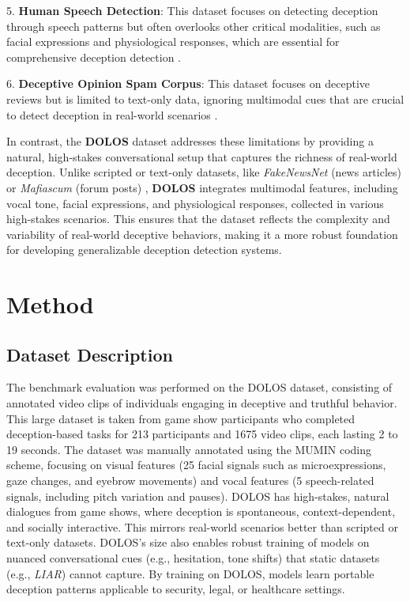\documentclass[11pt]{article}
\begin{document}
5. \textbf{Human Speech Detection}: This dataset focuses on detecting deception through speech patterns but often overlooks other critical modalities, such as facial expressions and physiological responses, which are essential for comprehensive deception detection \citep{Benus2016speech}.

6. \textbf{Deceptive Opinion Spam Corpus}: This dataset focuses on deceptive reviews but is limited to text-only data, ignoring multimodal cues that are crucial to detect deception in real-world scenarios \citep{ott2011findingdeceptive}.

In contrast, the \textbf{DOLOS} dataset \citep{guo2023audiovisualdeceptiondetectiondolos} addresses these limitations by providing a natural, high-stakes conversational setup that captures the richness of real-world deception. Unlike scripted or text-only datasets, like \textit{FakeNewsNet} (news articles) \citep{shu2019fakenewsnet} or \textit{Mafiascum} (forum posts) \citep{deruiter2019mafiascumdatasetlargetext}, \textbf{DOLOS} integrates multimodal features, including vocal tone, facial expressions, and physiological responses, collected in various high-stakes scenarios. This ensures that the dataset reflects the complexity and variability of real-world deceptive behaviors, making it a more robust foundation for developing generalizable deception detection systems.

\section{Method}

\subsection{Dataset Description}
The benchmark evaluation was performed on the DOLOS dataset, consisting of annotated video clips of individuals engaging in deceptive and truthful behavior. This large dataset is taken from game show participants who completed deception-based tasks for 213 participants and 1675 video clips, each lasting 2 to 19 seconds. The dataset was manually annotated using the MUMIN \citep{article} coding scheme, focusing on visual features (25 facial signals such as microexpressions, gaze changes, and eyebrow movements) and vocal features (5 speech-related signals, including pitch variation and pauses). DOLOS has high-stakes, natural dialogues from game shows, where deception is spontaneous, context-dependent, and socially interactive. This mirrors real-world scenarios better than scripted or text-only datasets. DOLOS's size also enables robust training of models on nuanced conversational cues (e.g., hesitation, tone shifts) that static datasets (e.g., \textit{LIAR}) cannot capture. By training on DOLOS, models learn portable deception patterns applicable to security, legal, or healthcare settings.
\end{document}

